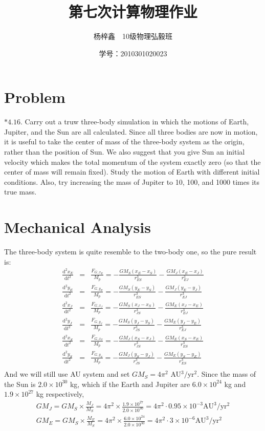 \documentclass[11pt,twoside,a4paper]{article}
\author{杨梓鑫\ \ 10级物理弘毅班}
\title{第七次计算物理作业}
\date{学号：2010301020023}
\newcommand{\ud}{\mathrm{d}}
\begin{document}
	\maketitle
\section{Problem}
$*\mathbf{4.16.}$ Carry out a truw three-body simulation in which the motions of Earth, Jupiter, and the Sun are all calculated. Since all three bodies are now in motion, it is useful to take the center of mass of the three-body system as the origin, rather than the position of Sun. We also suggest that you give Sun an initial velocity which makes the total momentum of the system exactly zero (so that the center of mass will remain fixed). Study the motion of Earth with different initial conditions. Also, try increasing the mass of Jupiter to 10, 100, and 1000 times its true mass.\\


\section{Mechanical Analysis}
The three-body system is quite resemble to the two-body one, so the pure result is:
\begin{eqnarray*}
\frac{\ud ^2x_E}{\ud t^2} &=& \frac{F_{G,x_E}}{M_p} = -\frac{GM_S\left(x_E-x_S\right)}{r_{ES}^3}-\frac{GM_J\left(x_E-x_J\right)}{r_{EJ}^3}\\	
\frac{\ud ^2y_E}{\ud t^2} &=& \frac{F_{G,y_E}}{M_p} = -\frac{GM_S\left(y_E-y_S\right)}{r_{ES}^3}-\frac{GM_J\left(y_E-y_J\right)}{r_{EJ}^3}\\	
\frac{\ud ^2x_J}{\ud t^2} &=& \frac{F_{G,x_J}}{M_p} = -\frac{GM_S\left(x_J-x_S\right)}{r_{JS}^3}-\frac{GM_E\left(x_J-x_E\right)}{r_{EJ}^3}\\	
\frac{\ud ^2y_J}{\ud t^2} &=& \frac{F_{G,y_J}}{M_p} = -\frac{GM_S\left(y_J-y_S\right)}{r_{JS}^3}-\frac{GM_E\left(y_J-y_E\right)}{r_{EJ}^3}\\	
\frac{\ud ^2x_S}{\ud t^2} &=& \frac{F_{G,x_S}}{M_p} = -\frac{GM_J\left(x_S-x_J\right)}{r_{JS}^3}-\frac{GM_E\left(x_S-x_E\right)}{r_{ES}^3}\\	
\frac{\ud ^2y_S}{\ud t^2} &=& \frac{F_{G,y_S}}{M_p} = -\frac{GM_J\left(y_S-y_J\right)}{r_{JS}^3}-\frac{GM_E\left(y_S-y_E\right)}{r_{ES}^3}\\	
\end{eqnarray*}
And we will still use AU system and set $GM_S =4\pi^2$ AU$^3/$yr$^2$. Since the mass of the Sun is $2.0\times 10^30$ kg, which if the Earth and Jupiter are $6.0\times 10^{24}$ kg and $1.9\times 10^{27}$ kg respectively, 
\begin{eqnarray*}
GM_J = GM_S\times\frac{M_J}{M_S}=4\pi^2\times\frac{1.9\times 10^{27}}{2.0\times 10^{30}}=4\pi^2\cdot0.95 \times 10^{-3}\mathrm{ AU}^3/\mathrm{yr^2}\\
GM_E = GM_S\times\frac{M_E}{M_S}=4\pi^2\times\frac{6.0\times 10^{24}}{2.0\times 10^{30}}=4\pi^2\cdot   3 \times 10^{-6}\mathrm{ AU}^3/\mathrm{yr^2}\\
\end{eqnarray*}
\end{document}

